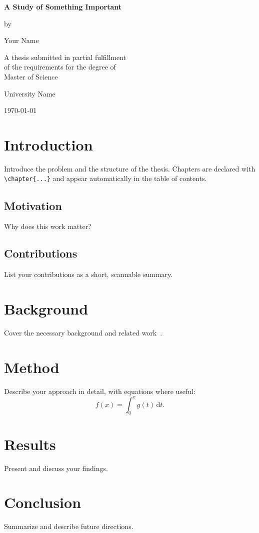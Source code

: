 \documentclass[11pt,a4paper,oneside]{report}
\begin{document}
\begin{titlepage}
  \centering
  \vspace*{2cm}
  {\LARGE\bfseries A Study of Something Important\par}
  \vspace{1.5cm}
  {\large by\par}
  \vspace{0.5cm}
  {\Large Your Name\par}
  \vfill
  {\large A thesis submitted in partial fulfillment\\ of the requirements for the degree of\\ Master of Science\par}
  \vspace{1cm}
  {\large University Name\par}
  {\large \today\par}
\end{titlepage}

\tableofcontents
\clearpage

\chapter{Introduction}
Introduce the problem and the structure of the thesis. Chapters are declared with
\verb|\chapter{...}| and appear automatically in the table of contents.

\section{Motivation}
Why does this work matter?

\section{Contributions}
List your contributions as a short, scannable summary.

\chapter{Background}
Cover the necessary background and related work~\cite{ref1}.

\chapter{Method}
Describe your approach in detail, with equations where useful:
\begin{equation}
  f(x) = \int_{0}^{x} g(t)\,\mathrm{d}t.
\end{equation}

\chapter{Results}
Present and discuss your findings.

\chapter{Conclusion}
Summarize and describe future directions.



\end{document}
